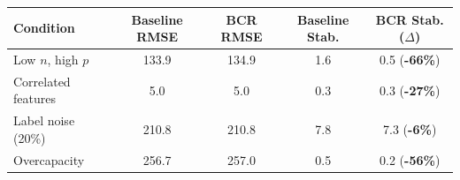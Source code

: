 \begin{tabular}{lcccc}
\toprule
Condition & Baseline RMSE & BCR RMSE & Baseline Stab. & BCR Stab. ($\Delta$) \\
\midrule
Low $n$, high $p$ & 133.9 & 134.9 & 1.6 & 0.5 (\textbf{-66\%}) \\
Correlated features & 5.0 & 5.0 & 0.3 & 0.3 (\textbf{-27\%}) \\
Label noise (20\%) & 210.8 & 210.8 & 7.8 & 7.3 (\textbf{-6\%}) \\
Overcapacity & 256.7 & 257.0 & 0.5 & 0.2 (\textbf{-56\%}) \\
\bottomrule
\end{tabular}
